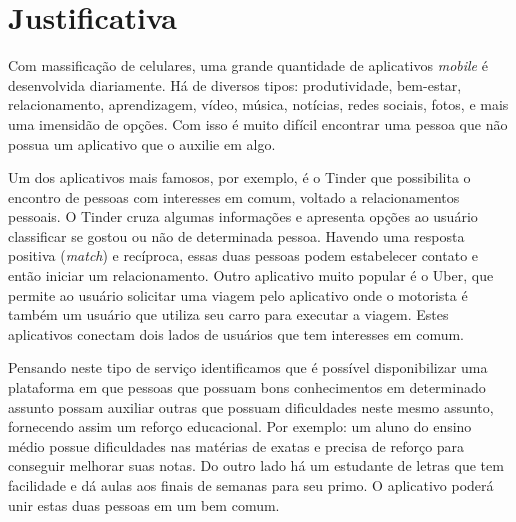 \chapter[Justificativa]{Justificativa}

Com massificação de celulares, uma grande quantidade de aplicativos \emph{mobile} é desenvolvida diariamente. Há de diversos tipos: produtividade, bem-estar, relacionamento, aprendizagem, vídeo, música, notícias, redes sociais, fotos, e mais uma imensidão de opções. 
Com isso é muito difícil encontrar uma pessoa que não possua um aplicativo que o auxilie em algo. 

Um dos aplicativos mais famosos, por exemplo, é o Tinder que possibilita o encontro de pessoas com interesses em comum, voltado a relacionamentos pessoais. O Tinder cruza algumas informações e apresenta opções ao usuário classificar se gostou ou não de determinada pessoa. Havendo uma resposta positiva (\emph{match}) e recíproca, essas duas pessoas podem estabelecer contato e então iniciar um relacionamento. Outro aplicativo muito popular é o Uber, que permite ao usuário solicitar uma viagem pelo aplicativo onde o motorista é também um usuário que utiliza seu carro para executar a viagem. Estes aplicativos conectam dois lados de usuários que tem interesses em comum.

Pensando neste tipo de serviço identificamos que é possível disponibilizar uma plataforma em que pessoas que possuam bons conhecimentos em determinado assunto possam auxiliar outras que possuam dificuldades neste mesmo assunto, fornecendo assim um reforço educacional. Por exemplo: um aluno do ensino médio possue dificuldades nas matérias de exatas e precisa de reforço para conseguir melhorar suas notas. Do outro lado há um estudante de letras que tem facilidade e dá aulas aos finais de semanas para seu primo. O aplicativo poderá unir estas duas pessoas em um bem comum.

